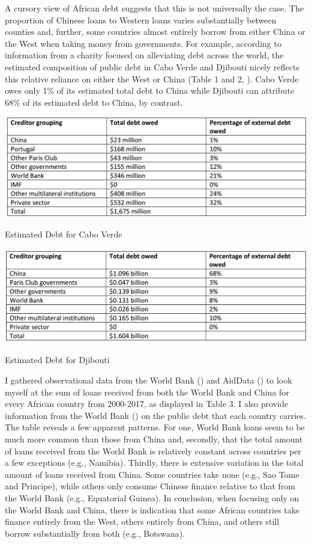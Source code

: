 \documentclass[12pt]{article}
\begin{document}
A cursory view of African debt suggests that this is not universally the case. The proportion of Chinese loans to Western loans varies substantially between counties and, further, some countries almost entirely borrow from either China or the West when taking money from governments. For example, according to information from a charity focused on alleviating debt across the world, the estimated composition of public debt in Cabo Verde and Djibouti nicely reflects this relative reliance on either the West or China (Table 1 and 2, \cite{jubileedebtcampaign2018}). Cabo Verde owes only 1\% of its estimated total debt to China while Djibouti can attribute 68\% of its estimated debt to China, by contrast.

\begin{table}
    \centering
    \includegraphics[scale=0.5]{Figures/CaboVerde.png}
    \caption{Estimated Debt for Cabo Verde}
    \vspace{1cm}
    \includegraphics[scale=0.5025]{Figures/Djibouti.png}
    \caption{Estimated Debt for Djibouti}
\end{table}

I gathered observational data from the World Bank (\cite{theworldbankgroup2022a}) and AidData (\cite{custer2021}) to look myself at the sum of loans received from both the World Bank and China for every African country from 2000-2017, as displayed in Table 3. I also provide information from the World Bank (\cite{theworldbankgroup2022}) on the public debt that each country carries. The table reveals a few apparent patterns. For one, World Bank loans seem to be much more common than those from China and, secondly, that the total amount of loans received from the World Bank is relatively constant across countries per a few exceptions (e.g., Namibia). Thirdly, there is extensive variation in the total amount of loans received from China. Some countries take none (e.g., Sao Tome and Principe), while others only consume Chinese finance relative to that from the World Bank (e.g., Equatorial Guinea). In conclusion, when focusing only on the World Bank and China, there is indication that some African countries take finance entirely from the West, others entirely from China, and others still borrow substantially from both (e.g., Botswana).
\end{document}
